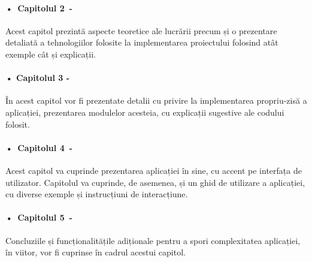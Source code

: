 \paragraph{•\, Capitolul 2\, -}Acest capitol prezintă aspecte teoretice ale lucrării precum și o prezentare detaliată a tehnologiilor folosite la implementarea proiectului folosind  atât exemple cât și explicații.

\paragraph{• Capitolul 3 -}În acest capitol vor fi prezentate detalii cu privire la implementarea propriu-zisă a aplicației, prezentarea modulelor acesteia, cu explicații sugestive ale codului folosit.

\paragraph{•\, Capitolul 4\, -}Acest capitol va cuprinde prezentarea aplicației în sine, cu accent pe interfața de utilizator. Capitolul va cuprinde, de asemenea, și un ghid de utilizare a aplicației, cu diverse exemple și instrucțiuni de interacțiune.

\paragraph{•\, Capitolul 5\, -}Concluziile și funcționalitățile adiționale pentru a spori complexitatea aplicației, în viitor, vor fi cuprinse în cadrul acestui capitol.

\label{chap:01}


